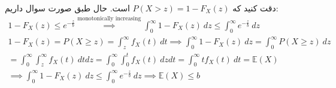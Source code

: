 \\
دقت کنید که
$P(X > z) = 1 - F_X(z)$
است. حال طبق صورت سوال داریم:
\begin{gather*}
    1 - F_X(z) \leq e^{-\frac{z}{b}} \stackrel{\text{monotonically increasing}}{\implies}  \int_{0}^{\infty} 1 - F_X(z) ~ dz \leq \int_{0}^{\infty} e^{-\frac{z}{b}} ~ dz\\
    1 - F_X(z) = P(X\geq z) = \int_z^\infty f_X(t) ~ dt \implies \int_0^\infty 1 - F_X(z) ~ dz = \int_0^\infty P(X\geq z) ~ dz\\
    = \int_0^\infty \int_z^\infty f_X(t) ~ dt dz = \int_0^\infty \int_0^t f_X(t) ~ dz dt = \int_0^\infty t f_X(t) ~ dt = \mathbb{E}(X)\\
    \implies \int_{0}^{\infty} 1 - F_X(z) ~ dz \leq \int_{0}^{\infty} e^{-\frac{z}{b}} ~ dz \implies \mathbb{E}(X) \leq b
\end{gather*}